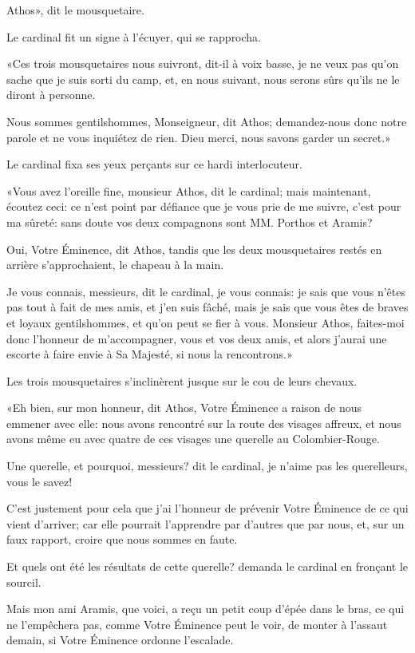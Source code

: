 \speak  Athos», dit le mousquetaire. 

Le cardinal fit un signe à l'écuyer, qui se rapprocha. 

«Ces trois mousquetaires nous suivront, dit-il à voix basse, je ne veux pas qu'on sache que je suis sorti du camp, et, en nous suivant, nous serons sûrs qu'ils ne le diront à personne. 

\speak  Nous sommes gentilshommes, Monseigneur, dit Athos; demandez-nous donc notre parole et ne vous inquiétez de rien. Dieu merci, nous savons garder un secret.» 

Le cardinal fixa ses yeux perçants sur ce hardi interlocuteur. 

«Vous avez l'oreille fine, monsieur Athos, dit le cardinal; mais maintenant, écoutez ceci: ce n'est point par défiance que je vous prie de me suivre, c'est pour ma sûreté: sans doute vos deux compagnons sont MM. Porthos et Aramis? 

\speak  Oui, Votre Éminence, dit Athos, tandis que les deux mousquetaires restés en arrière s'approchaient, le chapeau à la main. 

\speak  Je vous connais, messieurs, dit le cardinal, je vous connais: je sais que vous n'êtes pas tout à fait de mes amis, et j'en suis fâché, mais je sais que vous êtes de braves et loyaux gentilshommes, et qu'on peut se fier à vous. Monsieur Athos, faites-moi donc l'honneur de m'accompagner, vous et vos deux amis, et alors j'aurai une escorte à faire envie à Sa Majesté, si nous la rencontrons.» 

Les trois mousquetaires s'inclinèrent jusque sur le cou de leurs chevaux. 

«Eh bien, sur mon honneur, dit Athos, Votre Éminence a raison de nous emmener avec elle: nous avons rencontré sur la route des visages affreux, et nous avons même eu avec quatre de ces visages une querelle au Colombier-Rouge. 

\speak  Une querelle, et pourquoi, messieurs? dit le cardinal, je n'aime pas les querelleurs, vous le savez! 

\speak  C'est justement pour cela que j'ai l'honneur de prévenir Votre Éminence de ce qui vient d'arriver; car elle pourrait l'apprendre par d'autres que par nous, et, sur un faux rapport, croire que nous sommes en faute. 

\speak  Et quels ont été les résultats de cette querelle? demanda le cardinal en fronçant le sourcil. 

\speak  Mais mon ami Aramis, que voici, a reçu un petit coup d'épée dans le bras, ce qui ne l'empêchera pas, comme Votre Éminence peut le voir, de monter à l'assaut demain, si Votre Éminence ordonne l'escalade. 

